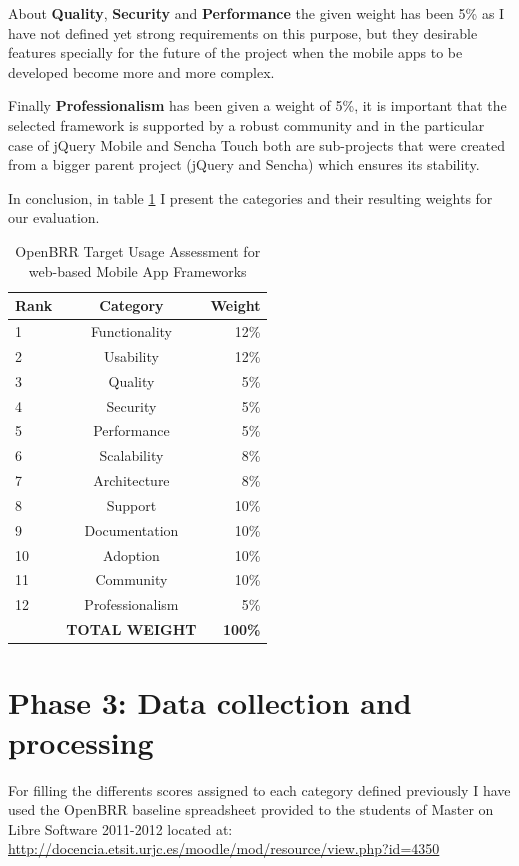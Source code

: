 \documentclass[a4paper,12pt]{book}
\begin{document}
About \textbf{Quality}, \textbf{Security} and \textbf{Performance} the given weight has been 5\% as I have not defined yet strong requirements on this purpose, but they desirable features specially for the future of the project when the mobile apps to be developed become more and more complex.

Finally \textbf{Professionalism} has been given a weight of 5\%, it is important that the selected framework is supported by a robust community and in the particular case of jQuery Mobile and Sencha Touch both are sub-projects that were created from a bigger parent project (jQuery and Sencha) which ensures its stability. 

In conclusion, in table \ref{OpenBRR2} I present the categories and
their resulting weights for our evaluation.

\begin{table}[ht]
\begin{center}
    \begin{tabular}{ | l | c | r |}
    \hline
    \textbf{Rank} & \textbf{Category} & \textbf{Weight} \\ \hline
    1 & Functionality & 12\% \\ \hline
    2 & Usability & 12\% \\ \hline
    3 & Quality & 5\% \\ \hline
    4 & Security & 5\% \\ \hline
    5 & Performance & 5\% \\ \hline
    6 & Scalability & 8\% \\ \hline
    7 & Architecture & 8\% \\ \hline
    8 & Support & 10\% \\ \hline
    9 & Documentation & 10\% \\ \hline
    10 & Adoption & 10\% \\ \hline
    11 & Community & 10\% \\ \hline
    12 & Professionalism & 5\% \\ \hline
     & \textbf{TOTAL WEIGHT} & \textbf{100\%} \\ \hline  
    \end{tabular}
\end{center}
 \caption{OpenBRR Target Usage Assessment for web-based Mobile App Frameworks}
\label{OpenBRR2}
\end{table}

\section{Phase 3: Data collection and processing}
\label{sec:phase3}
For filling the differents scores assigned to each category defined previously I have used the OpenBRR baseline spreadsheet provided to the students of Master on Libre Software 2011-2012 located at:\\
\url{http://docencia.etsit.urjc.es/moodle/mod/resource/view.php?id=4350}
\end{document}
